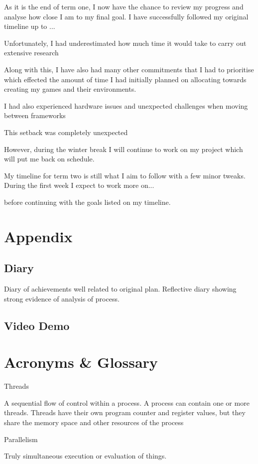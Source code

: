 \documentclass[]{project_interim}
\begin{document}
As it is the end of term one, I now have the chance to review my progress and analyse how close I
am to my final goal. I have successfully followed my original timeline up to ...

Unfortunately,
I had underestimated how much time it would take to carry out extensive research

Along with this, I have also had
many other commitments that I had to prioritise which effected the amount of time I had initially
planned on allocating towards creating my games and their environments.

I had also experienced hardware issues  and unexpected challenges when moving between frameworks

This setback was completely
unexpected

However, during the winter break I will continue to work on my
project which will put me back on schedule.

My timeline for term two is still what I aim to follow with a few minor tweaks. During the first
week I expect to work more on...

before continuing with the goals listed on my timeline.

\chapter{Appendix}
\section{Diary}
Diary of achievements well related to original plan.
Reflective diary showing strong evidence of analysis of process.
\section{Video Demo}

\chapter{Acronyms \& Glossary}

Threads

A sequential flow of control within a process. A process can contain one or more threads.
Threads have their own program counter and register values, but they share the memory space
and other resources of the process


Parallelism

Truly simultaneous execution or evaluation of things.
\end{document}
